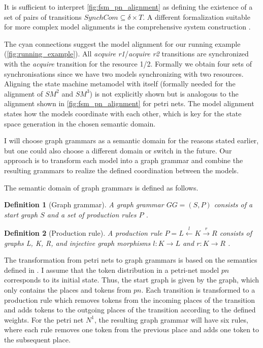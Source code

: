 \documentclass[conference]{IEEEtran}
\newtheorem{definition}{Definition}
\begin{document}
It is sufficient to interpret \autoref{fig:fsm_pn_alignment} as defining the existence of a set of pairs of transitions $SynchCom \subseteq \delta \times T$.
A different formalization suitable for more complex model alignments is the comprehensive system construction \cite{stunkelMultipleModelSynchronization2020}.

The cyan connections suggest the model alignment for our running example (\autoref{fig:running_example}).
All \textit{acquire r1}/\textit{acquire r2} transitions are synchronized with the \textit{acquire} transition for the resource 1/2.
Formally we obtain four sets of synchronisations since we have two models synchronizing with two resources.
Aligning the state machine metamodel with itself (formally needed for the alignment of $SM^2$ and $SM^3$) is not explicitly shown but is analogous to the alignment shown in \autoref{fig:fsm_pn_alignment} for petri nets.
The model alignment states how the models coordinate with each other, which is key for the state space generation in the chosen semantic domain.

I will choose graph grammars as a semantic domain for the reasons stated earlier, but one could also choose a different domain or switch in the future.
Our approach is to transform each model into a graph grammar and combine the resulting grammars to realize the defined coordination between the models.

The semantic domain of graph grammars is defined as follows.
\begin{definition}[Graph grammar] \label{def:graphGrammar}
A graph grammar $GG=(S, P)$ consists of a start graph $S$ and a set of production rules $P$ \cite{ehrigGraphGrammarsPetri2004}. 
\end{definition}
\begin{definition}[Production rule] \label{def:productionRule}
A production rule $P= L \overset{l}{\leftarrow} K \overset{r}{\to} R$ consists of graphs L, K, R, and injective graph morphisms $l: K \to L$ and $r: K \to R$ \cite{ehrigGraphGrammarsPetri2004}. 
\end{definition}

The transformation from petri nets to graph grammars is based on the semantics defined in \cite{ehrigGraphGrammarsPetri2004}.
I assume that the token distribution in a petri-net model $pn$ corresponds to its initial state.
Thus, the start graph is given by the graph, which only contains the places and tokens from $pn$.
Each transition is transformed to a production rule which removes tokens from the incoming places of the transition and adds tokens to the outgoing places of the transition according to the defined weights.
For the petri net $N^1$, the resulting graph grammar will have six rules, where each rule removes one token from the previous place and adds one token to the subsequent place.
\end{document}
